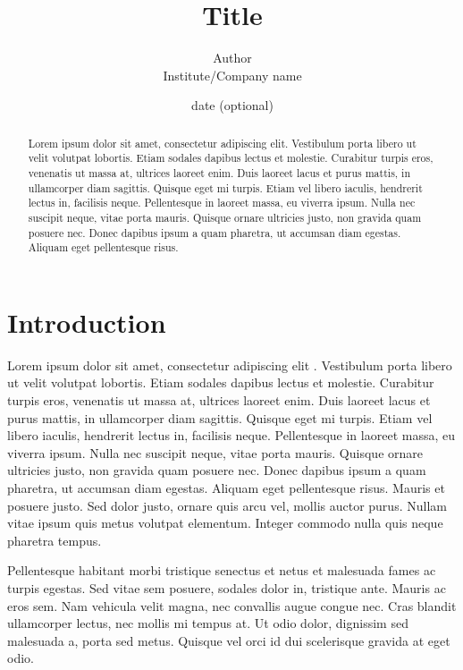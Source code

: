 \documentclass[11pt]{article}
\title{\textbf{Title}}
\author{Author \\ Institute/Company name}
\date{date (optional)}
\begin{document}
\maketitle

\begin{abstract}
Lorem ipsum dolor sit amet, consectetur adipiscing elit. Vestibulum porta libero ut velit volutpat lobortis. Etiam sodales dapibus lectus et molestie. Curabitur turpis eros, venenatis ut massa at, ultrices laoreet enim. Duis laoreet lacus et purus mattis, in ullamcorper diam sagittis. Quisque eget mi turpis. Etiam vel libero iaculis, hendrerit lectus in, facilisis neque. Pellentesque in laoreet massa, eu viverra ipsum. Nulla nec suscipit neque, vitae porta mauris. Quisque ornare ultricies justo, non gravida quam posuere nec. Donec dapibus ipsum a quam pharetra, ut accumsan diam egestas. Aliquam eget pellentesque risus.
\end{abstract}

\section{Introduction}
Lorem ipsum dolor sit amet, consectetur adipiscing elit \cite{lamport1986latex}. Vestibulum porta libero ut velit volutpat lobortis. Etiam sodales dapibus lectus et molestie. Curabitur turpis eros, venenatis ut massa at, ultrices laoreet enim. Duis laoreet lacus et purus mattis, in ullamcorper diam sagittis. Quisque eget mi turpis. Etiam vel libero iaculis, hendrerit lectus in, facilisis neque. Pellentesque in laoreet massa, eu viverra ipsum. Nulla nec suscipit neque, vitae porta mauris. Quisque ornare ultricies justo, non gravida quam posuere nec. Donec dapibus ipsum a quam pharetra, ut accumsan diam egestas. Aliquam eget pellentesque risus. Mauris et posuere justo. Sed dolor justo, ornare quis arcu vel, mollis auctor purus. Nullam vitae ipsum quis metus volutpat elementum. Integer commodo nulla quis neque pharetra tempus. 

 Pellentesque habitant morbi tristique senectus et netus et malesuada fames ac turpis egestas. Sed vitae sem posuere, sodales dolor in, tristique ante. Mauris ac eros sem. Nam vehicula velit magna, nec convallis augue congue nec. Cras blandit ullamcorper lectus, nec mollis mi tempus at. Ut odio dolor, dignissim sed malesuada a, porta sed metus. Quisque vel orci id dui scelerisque gravida at eget odio. 
\end{document}
